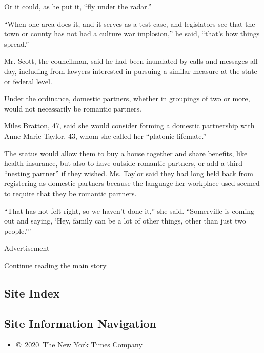 Or it could, as he put it, ``fly under the radar.''

``When one area does it, and it serves as a test case, and legislators
see that the town or county has not had a culture war implosion,'' he
said, ``that's how things spread.''

Mr. Scott, the councilman, said he had been inundated by calls and
messages all day, including from lawyers interested in pursuing a
similar measure at the state or federal level.

Under the ordinance, domestic partners, whether in groupings of two or
more, would not necessarily be romantic partners.

Miles Bratton, 47, said she would consider forming a domestic
partnership with Anne-Marie Taylor, 43, whom she called her ``platonic
lifemate.''

The status would allow them to buy a house together and share benefits,
like health insurance, but also to have outside romantic partners, or
add a third ``nesting partner'' if they wished. Ms. Taylor said they had
long held back from registering as domestic partners because the
language her workplace used seemed to require that they be romantic
partners.

``That has not felt right, so we haven't done it,'' she said.
``Somerville is coming out and saying, `Hey, family can be a lot of
other things, other than just two people.'''

Advertisement

\protect\hyperlink{after-bottom}{Continue reading the main story}

\hypertarget{site-index}{%
\subsection{Site Index}\label{site-index}}

\hypertarget{site-information-navigation}{%
\subsection{Site Information
Navigation}\label{site-information-navigation}}

\begin{itemize}
\tightlist
\item
  \href{https://help.nytimes.com/hc/en-us/articles/115014792127-Copyright-notice}{©~2020~The
  New York Times Company}
\end{itemize}

